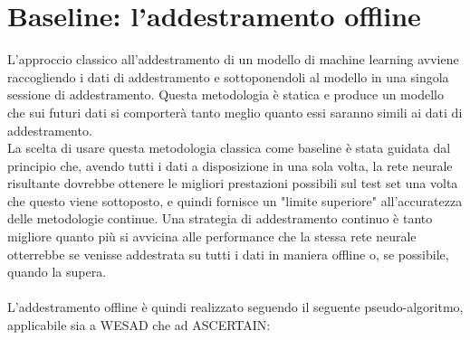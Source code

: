 \section{Baseline: l'addestramento offline}
L'approccio classico all'addestramento di un modello di machine learning avviene raccogliendo i dati di addestramento e sottoponendoli al modello in una singola sessione di addestramento. Questa metodologia è statica e produce un modello che sui futuri dati si comporterà tanto meglio quanto essi saranno simili ai dati di addestramento.\\
La scelta di usare questa metodologia classica come baseline è stata guidata dal principio che, avendo tutti i dati a disposizione in una sola volta, la rete neurale risultante dovrebbe ottenere le migliori prestazioni possibili sul test set una volta che questo viene sottoposto, e quindi fornisce un "limite superiore" all'accuratezza delle metodologie continue. Una strategia di addestramento continuo è tanto migliore quanto più si avvicina alle performance che la stessa rete neurale otterrebbe se venisse addestrata su tutti i dati in maniera offline o, se possibile, quando la supera.\\\\
L'addestramento offline è quindi realizzato seguendo il seguente pseudo-algoritmo, applicabile sia a WESAD che ad ASCERTAIN:
